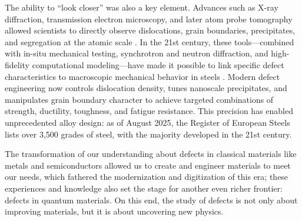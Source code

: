 The ability to “look closer” was also a key element. Advances such as X-ray diffraction, transmission electron microscopy, and later atom probe tomography allowed scientists to directly observe dislocations, grain boundaries, precipitates, and segregation at the atomic scale \cite{50YearsTEM}\cite{guoSegregationdislocationSelforganizedStructures2025}\cite{AtomProbeTomography}. In the 21st century, these tools—combined with in-situ mechanical testing, synchrotron and neutron diffraction, and high-fidelity computational modeling—have made it possible to link specific defect characteristics to macroscopic mechanical behavior in steels \cite{liReviewRecentProgress2022}\cite{kimSituNeutronDiffraction2020}\cite{gadalinskaDirectDeterminationPhase2021}. Modern defect engineering now controls dislocation density, tunes nanoscale precipitates, and manipulates grain boundary character to achieve targeted combinations of strength, ductility, toughness, and fatigue resistance. This precision has enabled unprecedented alloy design: as of August 2025, the Register of European Steels lists over 3,500 grades of steel, with the majority developed in the 21st century.

The transformation of our understanding about defects in classical materials like metals and semiconductors allowed us to create and engineer materials to meet our needs, which fathered the modernization and digitization of this era; these experiences and knowledge also set the stage for another even richer frontier: defects in quantum materials. On this end, the study of defects is not only about improving materials, but it is about uncovering new physics. 

